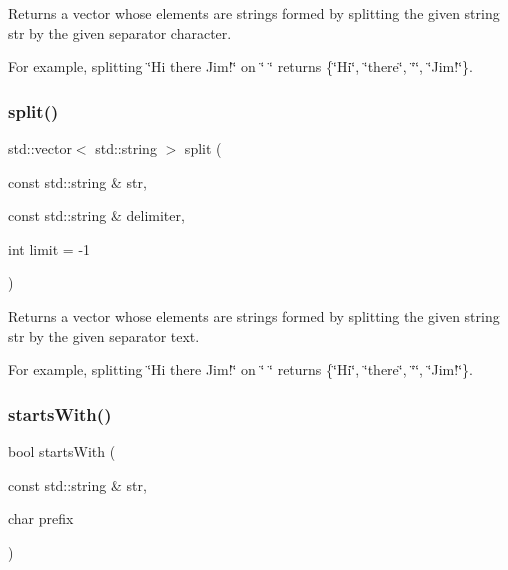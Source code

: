Returns a vector whose elements are strings formed by splitting the given string \textquotesingle{}str\textquotesingle{} by the given separator character. 

For example, splitting \char`\"{}\+Hi there  Jim!\char`\"{} on \char`\"{} \char`\"{} returns \{\char`\"{}\+Hi\char`\"{}, \char`\"{}there\char`\"{}, \char`\"{}\char`\"{}, \char`\"{}\+Jim!\char`\"{}\}. \mbox{\label{namespacesgl_1_1priv_1_1strlib_addd79cd11aaf0c887c9190aee4457cfb}} 
\subsubsection{\texorpdfstring{split()}{split()}\hspace{0.1cm}{\footnotesize\ttfamily [2/2]}}
{\footnotesize\ttfamily std\+::vector$<$ std\+::string $>$ split (\begin{DoxyParamCaption}\item[{const std\+::string \&}]{str,  }\item[{const std\+::string \&}]{delimiter,  }\item[{int}]{limit = {\ttfamily -\/1} }\end{DoxyParamCaption})}



Returns a vector whose elements are strings formed by splitting the given string \textquotesingle{}str\textquotesingle{} by the given separator text. 

For example, splitting \char`\"{}\+Hi there  Jim!\char`\"{} on \char`\"{} \char`\"{} returns \{\char`\"{}\+Hi\char`\"{}, \char`\"{}there\char`\"{}, \char`\"{}\char`\"{}, \char`\"{}\+Jim!\char`\"{}\}. \mbox{\label{namespacesgl_1_1priv_1_1strlib_a612efd2a5aec9ec46eb60da87788f522}} 
\subsubsection{\texorpdfstring{starts\+With()}{startsWith()}\hspace{0.1cm}{\footnotesize\ttfamily [1/2]}}
{\footnotesize\ttfamily bool starts\+With (\begin{DoxyParamCaption}\item[{const std\+::string \&}]{str,  }\item[{char}]{prefix }\end{DoxyParamCaption})}



